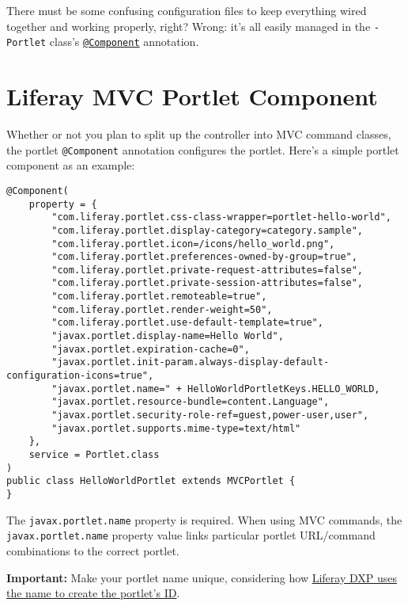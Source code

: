 There must be some confusing configuration files to keep everything
wired together and working properly, right? Wrong: it's all easily
managed in the \texttt{-Portlet} class's
\href{https://docs.osgi.org/javadoc/osgi.cmpn/7.0.0/org/osgi/service/component/annotations/Component.html}{\texttt{@Component}}
annotation.

\section{Liferay MVC Portlet
Component}\label{liferay-mvc-portlet-component}

Whether or not you plan to split up the controller into MVC command
classes, the portlet \texttt{@Component} annotation configures the
portlet. Here's a simple portlet component as an example:

\begin{verbatim}
@Component(
    property = {
        "com.liferay.portlet.css-class-wrapper=portlet-hello-world",
        "com.liferay.portlet.display-category=category.sample",
        "com.liferay.portlet.icon=/icons/hello_world.png",
        "com.liferay.portlet.preferences-owned-by-group=true",
        "com.liferay.portlet.private-request-attributes=false",
        "com.liferay.portlet.private-session-attributes=false",
        "com.liferay.portlet.remoteable=true",
        "com.liferay.portlet.render-weight=50",
        "com.liferay.portlet.use-default-template=true",
        "javax.portlet.display-name=Hello World",
        "javax.portlet.expiration-cache=0",
        "javax.portlet.init-param.always-display-default-configuration-icons=true",
        "javax.portlet.name=" + HelloWorldPortletKeys.HELLO_WORLD,
        "javax.portlet.resource-bundle=content.Language",
        "javax.portlet.security-role-ref=guest,power-user,user",
        "javax.portlet.supports.mime-type=text/html"
    },
    service = Portlet.class
)
public class HelloWorldPortlet extends MVCPortlet {
}
\end{verbatim}

The \texttt{javax.portlet.name} property is required. When using MVC
commands, the \texttt{javax.portlet.name} property value links
particular portlet URL/command combinations to the correct portlet.

\noindent\hrulefill

\textbf{Important:} Make your portlet name unique, considering how
\href{/docs/7-2/reference/-/knowledge_base/r/portlet-descriptor-to-osgi-service-property-map\#ten}{Liferay
DXP uses the name to create the portlet's ID}.

